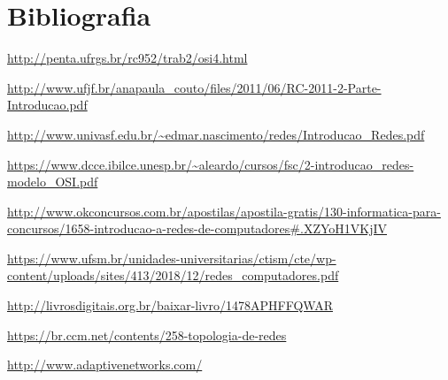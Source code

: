 \section{Bibliografia}
\vspace*{1cm}
\url{http://penta.ufrgs.br/rc952/trab2/osi4.html}
\par
\url{http://www.ufjf.br/anapaula_couto/files/2011/06/RC-2011-2-Parte-Introducao.pdf}
\par
\url{http://www.univasf.edu.br/~edmar.nascimento/redes/Introducao_Redes.pdf}
\par
\url{https://www.dcce.ibilce.unesp.br/~aleardo/cursos/fsc/2-introducao_redes-modelo_OSI.pdf}
\par
\url{http://www.okconcursos.com.br/apostilas/apostila-gratis/130-informatica-para-concursos/1658-introducao-a-redes-de-computadores#.XZYoH1VKjIV}
\par
\url{https://www.ufsm.br/unidades-universitarias/ctism/cte/wp-content/uploads/sites/413/2018/12/redes_computadores.pdf}
\par
\url{http://livrosdigitais.org.br/baixar-livro/1478APHFFQWAR}
\par
\url{https://br.ccm.net/contents/258-topologia-de-redes}
\par
\url{http://www.adaptivenetworks.com/}
\newpage

